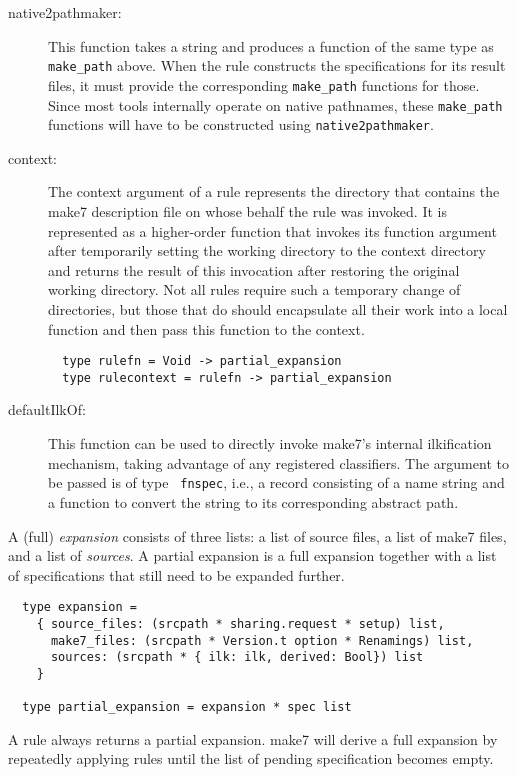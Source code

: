 \begin{description}
\item[native2pathmaker:] This function takes a string and produces a
function of the same type as {\tt make_path} above.  When the rule
constructs the specifications for its result files, it must provide
the corresponding {\tt make_path} functions for those.  Since most tools
internally operate on native pathnames, these {\tt make_path} functions
will have to be constructed using {\tt native2pathmaker}.
\item[context:] The context argument of a rule represents the
directory that contains the make7 description file on whose behalf the
rule was invoked.  It is represented as a higher-order function that
invokes its function argument after temporarily setting the working
directory to the context directory and returns the result of this
invocation after restoring the original working directory.  Not all
rules require such a temporary change of directories, but those that
do should encapsulate all their work into a local function and then
pass this function to the context.
\begin{verbatim}
  type rulefn = Void -> partial_expansion
  type rulecontext = rulefn -> partial_expansion
\end{verbatim}
\item[defaultIlkOf:] This function can be used to directly invoke
make7's internal ilkification mechanism, taking advantage of any
registered classifiers.  The argument to be passed is of type {\tt
fnspec}, i.e., a record consisting of a name string and a function to
convert the string to its corresponding abstract path.
\end{description}

A (full) {\em expansion} consists of three lists: a list of source files,
a list of make7 files, and a list of {\em sources}.  A partial expansion
is a full expansion together with a list of specifications that still
need to be expanded further.

\begin{verbatim}
  type expansion =
    { source_files: (srcpath * sharing.request * setup) list,
      make7_files: (srcpath * Version.t option * Renamings) list,
      sources: (srcpath * { ilk: ilk, derived: Bool}) list
    }

  type partial_expansion = expansion * spec list
\end{verbatim}

A rule always returns a partial expansion.  make7 will derive a full
expansion by repeatedly applying rules until the list of pending
specification becomes empty.

